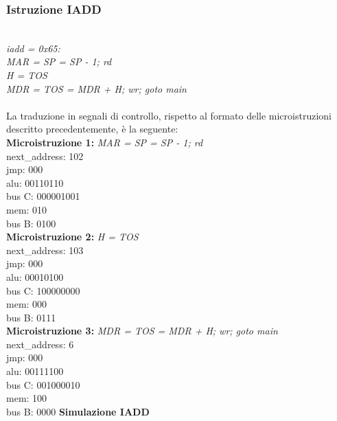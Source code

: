 \documentclass[12pt]{article}
\begin{document}
\subsubsection{Istruzione IADD}
\textit{
    \\iadd = 0x65:
    \\\hspace*{2cm} MAR = SP = SP - 1; rd
    \\\hspace*{2cm} H = TOS
    \\\hspace*{2cm} MDR = TOS = MDR + H; wr; goto main
}
\\\\La traduzione in segnali di controllo, rispetto al formato delle microistruzioni descritto precedentemente, è la seguente:
\\ \textbf{Microistruzione 1:}	\hspace*{1cm} \textit{MAR = SP = SP - 1; rd}
\\\hspace*{1cm} next\_address: 102
\\\hspace*{1cm} jmp: 000
\\\hspace*{1cm} alu: 00110110
\\\hspace*{1cm} bus C: 000001001
\\\hspace*{1cm} mem: 010
\\\hspace*{1cm} bus B: 0100
\\ \textbf{Microistruzione 2:} \hspace*{1cm} \textit{ H = TOS}
\\\hspace*{1cm} next\_address: 103
\\\hspace*{1cm} jmp: 000
\\\hspace*{1cm} alu: 00010100
\\\hspace*{1cm} bus C: 100000000
\\\hspace*{1cm} mem: 000
\\\hspace*{1cm} bus B: 0111
\\ \textbf{Microistruzione 3:} \hspace*{1cm} \textit{MDR = TOS = MDR + H; wr; goto main}
\\\hspace*{1cm} next\_address: 6
\\\hspace*{1cm} jmp: 000
\\\hspace*{1cm} alu: 00111100
\\\hspace*{1cm} bus C: 001000010
\\\hspace*{1cm} mem: 100
\\\hspace*{1cm} bus B: 0000
\clearpage
{\large \textbf{Simulazione IADD}}
\end{document}

